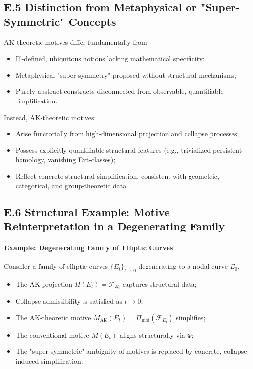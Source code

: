 \documentclass[11pt]{article}
\begin{document}
\subsection*{E.5 Distinction from Metaphysical or "Super-Symmetric" Concepts}

AK-theoretic motives differ fundamentally from:

\begin{itemize}
    \item Ill-defined, ubiquitous notions lacking mathematical specificity;
    \item Metaphysical "super-symmetry" proposed without structural mechanisms;
    \item Purely abstract constructs disconnected from observable, quantifiable simplification.
\end{itemize}

Instead, AK-theoretic motives:

\begin{itemize}
    \item Arise functorially from high-dimensional projection and collapse processes;
    \item Possess explicitly quantifiable structural features (e.g., trivialized persistent homology, vanishing Ext-classes);
    \item Reflect concrete structural simplification, consistent with geometric, categorical, and group-theoretic data.
\end{itemize}

\subsection*{E.6 Structural Example: Motive Reinterpretation in a Degenerating Family}

\paragraph{Example: Degenerating Family of Elliptic Curves}

Consider a family of elliptic curves $\{E_t\}_{t \to 0}$ degenerating to a nodal curve $E_0$.

\begin{itemize}
    \item The AK projection $\Pi(E_t) = \mathcal{F}_{E_t}$ captures structural data;
    \item Collapse-admissibility is satisfied as $t \to 0$;
    \item The AK-theoretic motive $M_{\mathrm{AK}}(E_t) = \Pi_{\mathrm{mot}}(\mathcal{F}_{E_t})$ simplifies;
    \item The conventional motive $M(E_t)$ aligns structurally via $\Phi$;
    \item The "super-symmetric" ambiguity of motives is replaced by concrete, collapse-induced simplification.
\end{itemize}
\end{document}
